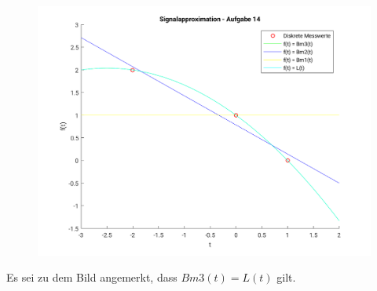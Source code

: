 	\begin{figure}
		\includegraphics[scale = 0.7]{A14_plot.png}
	\end{figure}
	Es sei zu dem Bild angemerkt, dass $Bm3(t) = L(t)$ gilt.


